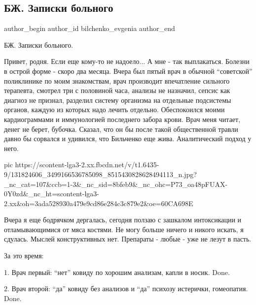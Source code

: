  
 
 
 
 
 
\subsection{БЖ. Записки больного}
\label{sec:22_12_2020.fb.bilchenko_evgenia.1.zapiski_bolnogo}
\ifcmt
 author_begin
   author_id bilchenko_evgenia
 author_end
\fi

БЖ. Записки больного.

Привет, родня. Если еще кому-то не надоело... А мне - так выплакаться. Болезни
в острой форме - скоро два месяца. Вчера был пятый врач в обычной \enquote{советской}
поликлинике по моим знакомствам, врач производит впечатление сильного
терапевта, смотрел три с половиной часа, анализы не назначил, сепсис как
диагноз не признал, разделил систему организма на отдельные подсистемы органов,
каждую из которых надо лечить отдельно. Обеспокоился моими кардиограммами и
иммунологией последнего забора крови. Врач меня читает, денег не берет,
бубочка. Сказал, что он бы после такой общественной травли давно бы сорвался и
удивился,  что Бильченко еще жива. Аналитический подход у него. 

\ifcmt
  pic https://scontent-lga3-2.xx.fbcdn.net/v/t1.6435-9/131824606_3499166536785098_8515430828628494113_n.jpg?_nc_cat=107&ccb=1-3&_nc_sid=8bfeb9&_nc_ohc=P73_oa48pFUAX-0Y0zd&_nc_ht=scontent-lga3-2.xx&oh=3ada528930a479e9cd86e284c3c879e2&oe=60CA698E
\fi

Вчера я еще бодрячком дергалась, сегодня ползаю с зашкалом интоксикации и
отламывающимися от мяса костями. Не могу больше ничего и никого искать, я
сдулась. Мыслей конструктивных нет. Препараты - любые - уже не лезут в пасть.

За это время:

1. Врач первый: \enquote{нет} ковиду по хорошим анализам, капли в носик. Done.

2. Врач второй: \enquote{да} ковиду без анализов и \enquote{да} психозу истерички, гомеопатия. Done.

